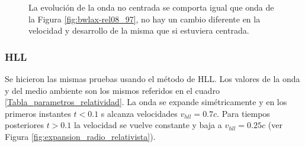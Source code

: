 \documentclass[12pt,a4paper]{book}
\begin{document}
\begin{figure}
\caption{\label{fig:bwlaxnc-rel00_65}La evolución de la onda no centrada se comporta igual que onda de la Figura \ref{fig:bwlax-rel08_97}, no hay un cambio diferente en la velocidad y desarrollo de la misma que si estuviera centrada.} 
\end{figure}



\subsubsection{HLL}


Se hicieron las mismas pruebas usando el método de HLL. Los valores de la onda y del medio ambiente son los mismos referidos en el cuadro \ref{Tabla_parametros_relatividad}. La onda se expande simétricamente y en los primeros instantes $t < 0.1$ s alcanza velocidades $v_{hll} = 0.7c$. Para tiempos posteriores $t > 0.1$ la velocidad se vuelve constante y baja a $v_{hll} = 0.25c$ (ver Figura \ref{fig:expansion_radio_relativista}).%
\end{document}
